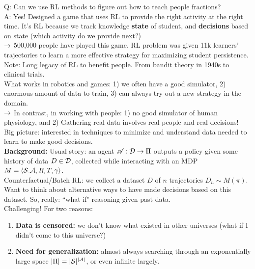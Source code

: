 Q: Can we use RL methods to figure out how to teach people fractions? \\

A: Yes! Designed a game that uses RL to provide the right activity at the right time. It's RL because we track knowledge {\bf state} of student, and {\bf decisions} based on state (which activity do we provide next?) \\

$\rightarrow$ 500,000 people have played this game. RL problem was given 11k learners' trajectories to learn a more effective strategy for maximizing student persistence. \\

Note: Long legacy of RL to benefit people. From bandit theory in 1940s to clinical trials. \\

What works in robotics and games: 1) we often have a good simulator, 2) enormous amount of data to train, 3) can always try out a new strategy in the domain. \\

$\rightarrow$ In contrast, in working with people: 1) no good simulator of human physiology, and 2) Gathering real data involves real people and real decisions! \\

Big picture: interested in techniques to minimize and understand data needed to learn to make good decisions. \\

{\bf Background:} Usual story: an agent $\mathscr{A} : \mathcal{D} \rightarrow \Pi$ outputs a policy given some history of data $D \in \mathcal{D}$, collected while interacting with an MDP $M = \langle \mathcal{S}. \mathcal{A}, R, T, \gamma \rangle$. \\

Counterfactual/Batch RL: we collect a dataset $D$ of $n$ trajectories $D_n \sim M(\pi)$. \\

Want to think about alternative ways to have made decisions based on this dataset. So, really: ``what if" reasoning given past data. \\

Challenging! For two reasons:
\begin{enumerate}
    \item {\bf Data is censored:} we don't know what existed in other universes (what if I didn't come to this universe?)
    \item {\bf Need for generalization:} almost always searching through an exponentially large space $|\Pi| = |\mathcal{S}|^{|\mathcal{A}|}$, or even infinite largely.
\end{enumerate}

